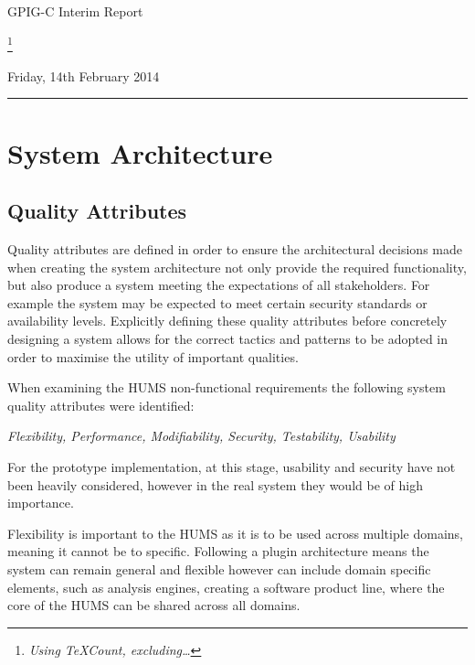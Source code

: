 \documentclass[10pt,a4paper]{article}
\begin{document}
\begin{center}
{\Large GPIG-C Interim Report}

\footnote{\textit{Using TeXCount, excluding\ldots}}

Friday, 14th February 2014
\end{center}

\vspace{0.3cm}
\rule{\textwidth}{0.4pt}




\section{System Architecture}
\label{sec:architecture}

\subsection{Quality Attributes}
\label{sec:architecture-quality}

Quality attributes are defined in order to ensure the architectural decisions 
made when creating the system architecture not only provide the required 
functionality, but also produce a system meeting the expectations of all 
stakeholders. For example the system may be expected to meet certain 
security standards or availability levels. Explicitly defining these quality 
attributes before concretely designing a system allows for the correct 
tactics 
and patterns to be adopted in order to maximise the utility of important 
qualities.

When examining the HUMS non-functional requirements the following 
system 
quality attributes were identified:
	\begin{center}
	\textit{Flexibility, Performance, Modifiability, Security, 
Testability, Usability}
	\end{center}
For the prototype implementation, at this stage, usability and security 
have not been heavily considered, however in the real system they 
would be of high importance.

Flexibility is important to the HUMS as it is to be used across multiple 
domains, meaning it cannot be to specific. Following a plugin 
architecture means the system can remain general and flexible however 
can include domain specific elements, such as analysis engines, 
creating a software product line, where the core of the HUMS can be 
shared across all domains.
\end{document}
